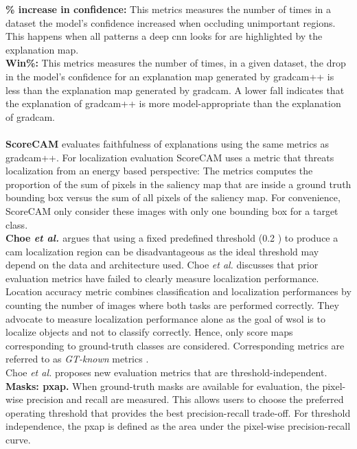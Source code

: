 \textbf{\% increase in confidence:} This metrics measures the number of times in a dataset the model's confidence increased when occluding unimportant regions. This happens when all patterns a deep \acrshort{cnn} looks for are highlighted by the explanation map.\\
\textbf{Win\%:} This metrics measures the number of times, in a given dataset, the drop in the model's confidence for an explanation map generated by \acrshort{gradcam}++ is less than the explanation map generated by \acrshort{gradcam}. A lower fall indicates that the explanation of \acrshort{gradcam}++ is more model-appropriate than the explanation of \acrshort{gradcam}.\\
\\
\textbf{ScoreCAM} evaluates faithfulness of explanations using the same metrics as \acrshort{gradcam}++. For localization evaluation ScoreCAM uses a metric that threats localization from an energy based perspective: The metrics computes the proportion of the sum of pixels in the saliency map that are inside a ground truth bounding box versus the sum of all pixels of the saliency map. For convenience, ScoreCAM only consider these images with only one bounding box for a target class.
\\
\textbf{Choe \textit{et al.} \cite{choe2020evaluating}} argues that using a fixed predefined threshold (0.2 \cite{zhou2016cvpr}) to produce a \acrshort{cam} localization region can be  disadvantageous as the ideal threshold may depend on the data and architecture used. Choe \textit{et al.} discusses that prior evaluation metrics have failed to clearly measure localization performance. Location accuracy \cite{russakovsky2015imagenet} metric combines classification and localization performances by counting the number of images where both tasks are performed correctly. They advocate to measure localization performance alone as the goal of \acrshort{wsol} is to localize objects and not to classify correctly. Hence, only score maps corresponding to ground-truth classes are considered. Corresponding metrics are referred to as \textit{GT-known} metrics \cite{choe2019attention, singh2017hide, zhang2018adversarial, zhang2018self}. \\
Choe \textit{et al.} proposes new evaluation metrics that are threshold-independent. 
\textbf{Masks: \acrshort{pxap}.} When ground-truth masks are available for evaluation, the pixel-wise precision and recall \cite{achanta2009frequency} are measured. This allows users to choose the preferred operating threshold that provides the best precision-recall trade-off. For threshold independence, the \acrfull{pxap} is defined as the area under the pixel-wise precision-recall curve.\\
